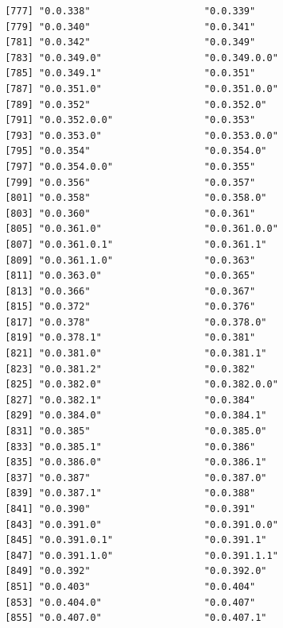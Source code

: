 \documentclass[
  letterpaper,
  DIV=11,
  numbers=noendperiod]{scrreprt}
\begin{document}
\begin{verbatim}
 [777] "0.0.338"                    "0.0.339"                   
 [779] "0.0.340"                    "0.0.341"                   
 [781] "0.0.342"                    "0.0.349"                   
 [783] "0.0.349.0"                  "0.0.349.0.0"               
 [785] "0.0.349.1"                  "0.0.351"                   
 [787] "0.0.351.0"                  "0.0.351.0.0"               
 [789] "0.0.352"                    "0.0.352.0"                 
 [791] "0.0.352.0.0"                "0.0.353"                   
 [793] "0.0.353.0"                  "0.0.353.0.0"               
 [795] "0.0.354"                    "0.0.354.0"                 
 [797] "0.0.354.0.0"                "0.0.355"                   
 [799] "0.0.356"                    "0.0.357"                   
 [801] "0.0.358"                    "0.0.358.0"                 
 [803] "0.0.360"                    "0.0.361"                   
 [805] "0.0.361.0"                  "0.0.361.0.0"               
 [807] "0.0.361.0.1"                "0.0.361.1"                 
 [809] "0.0.361.1.0"                "0.0.363"                   
 [811] "0.0.363.0"                  "0.0.365"                   
 [813] "0.0.366"                    "0.0.367"                   
 [815] "0.0.372"                    "0.0.376"                   
 [817] "0.0.378"                    "0.0.378.0"                 
 [819] "0.0.378.1"                  "0.0.381"                   
 [821] "0.0.381.0"                  "0.0.381.1"                 
 [823] "0.0.381.2"                  "0.0.382"                   
 [825] "0.0.382.0"                  "0.0.382.0.0"               
 [827] "0.0.382.1"                  "0.0.384"                   
 [829] "0.0.384.0"                  "0.0.384.1"                 
 [831] "0.0.385"                    "0.0.385.0"                 
 [833] "0.0.385.1"                  "0.0.386"                   
 [835] "0.0.386.0"                  "0.0.386.1"                 
 [837] "0.0.387"                    "0.0.387.0"                 
 [839] "0.0.387.1"                  "0.0.388"                   
 [841] "0.0.390"                    "0.0.391"                   
 [843] "0.0.391.0"                  "0.0.391.0.0"               
 [845] "0.0.391.0.1"                "0.0.391.1"                 
 [847] "0.0.391.1.0"                "0.0.391.1.1"               
 [849] "0.0.392"                    "0.0.392.0"                 
 [851] "0.0.403"                    "0.0.404"                   
 [853] "0.0.404.0"                  "0.0.407"                   
 [855] "0.0.407.0"                  "0.0.407.1"                 

\end{verbatim}
\end{document}
